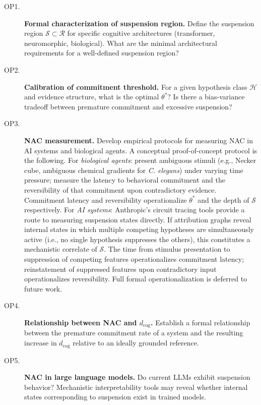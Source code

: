 \documentclass[12pt]{article}
\begin{document}
\begin{description}
  \item[OP1.] \textbf{Formal characterization of suspension region.}
    Define the suspension region $\mathcal{S} \subset \mathcal{R}$
    for specific cognitive architectures (transformer, neuromorphic,
    biological). What are the minimal architectural requirements for
    a well-defined suspension region?

  \item[OP2.] \textbf{Calibration of commitment threshold.}
    For a given hypothesis class $\mathcal{H}$ and evidence structure,
    what is the optimal $\theta^*$? Is there a bias-variance tradeoff
    between premature commitment and excessive suspension?

  \item[OP3.] \textbf{NAC measurement.}
    Develop empirical protocols for measuring NAC in AI systems and
    biological agents.
    A conceptual proof-of-concept protocol is the following.
    For \emph{biological agents}: present ambiguous stimuli (e.g.,
    Necker cube, ambiguous chemical gradients for \textit{C. elegans})
    under varying time pressure; measure the latency to behavioral
    commitment and the reversibility of that commitment upon
    contradictory evidence.
    Commitment latency and reversibility operationalize $\theta^*$ and
    the depth of $\mathcal{S}$ respectively.
    For \emph{AI systems}: Anthropic's circuit tracing tools
    \cite{anthropic2025circuit} provide a route to measuring suspension
    states directly.
    If attribution graphs reveal internal states in which multiple
    competing hypotheses are simultaneously active (i.e., no single
    hypothesis suppresses the others), this constitutes a mechanistic
    correlate of $\mathcal{S}$.
    The time from stimulus presentation to suppression of competing
    features operationalizes commitment latency; reinstatement of
    suppressed features upon contradictory input operationalizes
    reversibility.
    Full formal operationalization is deferred to future work.

  \item[OP4.] \textbf{Relationship between NAC and $d_\mathrm{cog}$.}
    Establish a formal relationship between the premature commitment
    rate of a system and the resulting increase in $d_\mathrm{cog}$
    relative to an ideally grounded reference.

  \item[OP5.] \textbf{NAC in large language models.}
    Do current LLMs exhibit suspension behavior? Mechanistic
    interpretability tools \cite{anthropic2025circuit} may reveal
    whether internal states corresponding to suspension exist in
    trained models.
\end{description}
\end{document}
